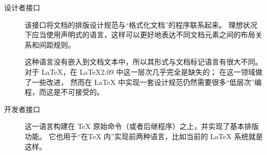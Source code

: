 \documentclass[full]{l3doc}
\begin{document}
\begin{description}
\item[设计者接口] 该接口将文档的排版设计规范与“格式化文档”的程序联系起来。
理想状况下应当使用声明式的语言，这样可以更好地表达不同文档元素之间的布局关系和间距规则。

%
这种语言没有嵌入到文档文本中，所以其形式与文档标记语言有很大不同。
对于 \LaTeX{}，在  \LaTeX{}2.09 中这一层次几乎完全是缺失的；
\LaTeXe{} 在这一领域做了一些改进，
然而在 \LaTeX{} 中实现一套设计规范仍然需要很多“低层次”编程，而这是不可接受的。

\item[开发者接口]
这一语言构建在 \TeX{} 原始命令（或者后继程序）之上，并实现了基本排版功能。
它也用于“在\TeX{} 内”实现前两种语言，比如当前的 \LaTeX{} 系统就是这样。
%
\end{description}

%
\end{document}
